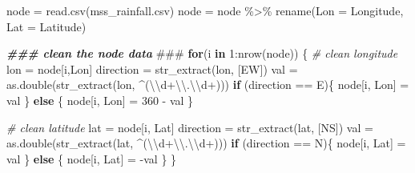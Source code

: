 \documentclass[
]{article}
\newenvironment{Shaded}{\begin{snugshade}}{\end{snugshade}}
\newcommand{\AlertTok}[1]{\textcolor[rgb]{0.94,0.16,0.16}{#1}}
\newcommand{\CommentTok}[1]{\textcolor[rgb]{0.56,0.35,0.01}{\textit{#1}}}
\newcommand{\ControlFlowTok}[1]{\textcolor[rgb]{0.13,0.29,0.53}{\textbf{#1}}}
\newcommand{\DecValTok}[1]{\textcolor[rgb]{0.00,0.00,0.81}{#1}}
\newcommand{\DocumentationTok}[1]{\textcolor[rgb]{0.56,0.35,0.01}{\textbf{\textit{#1}}}}
\newcommand{\FunctionTok}[1]{\textcolor[rgb]{0.00,0.00,0.00}{#1}}
\newcommand{\NormalTok}[1]{#1}
\newcommand{\OtherTok}[1]{\textcolor[rgb]{0.56,0.35,0.01}{#1}}
\newcommand{\SpecialCharTok}[1]{\textcolor[rgb]{0.00,0.00,0.00}{#1}}
\newcommand{\StringTok}[1]{\textcolor[rgb]{0.31,0.60,0.02}{#1}}
\begin{document}
\begin{Shaded}
\begin{Highlighting}[]
\NormalTok{node }\OtherTok{=} \FunctionTok{read.csv}\NormalTok{(}\StringTok{\textquotesingle{}mss\_rainfall.csv\textquotesingle{}}\NormalTok{)}
\NormalTok{node }\OtherTok{=}\NormalTok{ node }\SpecialCharTok{\%\textgreater{}\%}
  \FunctionTok{rename}\NormalTok{(}\StringTok{\textquotesingle{}Lon\textquotesingle{}} \OtherTok{=} \StringTok{\textquotesingle{}Longitude\textquotesingle{}}\NormalTok{, }\StringTok{\textquotesingle{}Lat\textquotesingle{}} \OtherTok{=} \StringTok{\textquotesingle{}Latitude\textquotesingle{}}\NormalTok{)}

\DocumentationTok{\#\#\# clean the node data }\AlertTok{\#\#\#}
\ControlFlowTok{for}\NormalTok{(i }\ControlFlowTok{in} \DecValTok{1}\SpecialCharTok{:}\FunctionTok{nrow}\NormalTok{(node)) \{}
  \CommentTok{\# clean longitude}
\NormalTok{  lon }\OtherTok{=}\NormalTok{ node[i,}\StringTok{\textquotesingle{}Lon\textquotesingle{}}\NormalTok{]}
\NormalTok{  direction }\OtherTok{=} \FunctionTok{str\_extract}\NormalTok{(lon, }\StringTok{\textquotesingle{}[EW]\textquotesingle{}}\NormalTok{)}
\NormalTok{  val }\OtherTok{=} \FunctionTok{as.double}\NormalTok{(}\FunctionTok{str\_extract}\NormalTok{(lon, }\StringTok{\textquotesingle{}\^{}(}\SpecialCharTok{\textbackslash{}\textbackslash{}}\StringTok{d+}\SpecialCharTok{\textbackslash{}\textbackslash{}}\StringTok{.}\SpecialCharTok{\textbackslash{}\textbackslash{}}\StringTok{d+)\textquotesingle{}}\NormalTok{))}
  \ControlFlowTok{if}\NormalTok{ (direction }\SpecialCharTok{==} \StringTok{\textquotesingle{}E\textquotesingle{}}\NormalTok{)\{}
\NormalTok{    node[i, }\StringTok{\textquotesingle{}Lon\textquotesingle{}}\NormalTok{] }\OtherTok{=}\NormalTok{ val}
\NormalTok{  \} }\ControlFlowTok{else}\NormalTok{ \{}
\NormalTok{    node[i, }\StringTok{\textquotesingle{}Lon\textquotesingle{}}\NormalTok{] }\OtherTok{=} \DecValTok{360} \SpecialCharTok{{-}}\NormalTok{ val}
\NormalTok{  \}}
  
  \CommentTok{\# clean latitude}
\NormalTok{  lat }\OtherTok{=}\NormalTok{ node[i, }\StringTok{\textquotesingle{}Lat\textquotesingle{}}\NormalTok{]}
\NormalTok{  direction }\OtherTok{=} \FunctionTok{str\_extract}\NormalTok{(lat, }\StringTok{\textquotesingle{}[NS]\textquotesingle{}}\NormalTok{)}
\NormalTok{  val }\OtherTok{=} \FunctionTok{as.double}\NormalTok{(}\FunctionTok{str\_extract}\NormalTok{(lat, }\StringTok{\textquotesingle{}\^{}(}\SpecialCharTok{\textbackslash{}\textbackslash{}}\StringTok{d+}\SpecialCharTok{\textbackslash{}\textbackslash{}}\StringTok{.}\SpecialCharTok{\textbackslash{}\textbackslash{}}\StringTok{d+)\textquotesingle{}}\NormalTok{))}
  \ControlFlowTok{if}\NormalTok{ (direction }\SpecialCharTok{==} \StringTok{\textquotesingle{}N\textquotesingle{}}\NormalTok{)\{}
\NormalTok{    node[i, }\StringTok{\textquotesingle{}Lat\textquotesingle{}}\NormalTok{] }\OtherTok{=}\NormalTok{ val}
\NormalTok{  \} }\ControlFlowTok{else}\NormalTok{ \{}
\NormalTok{    node[i, }\StringTok{\textquotesingle{}Lat\textquotesingle{}}\NormalTok{] }\OtherTok{=} \SpecialCharTok{{-}}\NormalTok{val}
\NormalTok{  \}}
\NormalTok{\}}


\end{Highlighting}
\end{Shaded}
\end{document}
